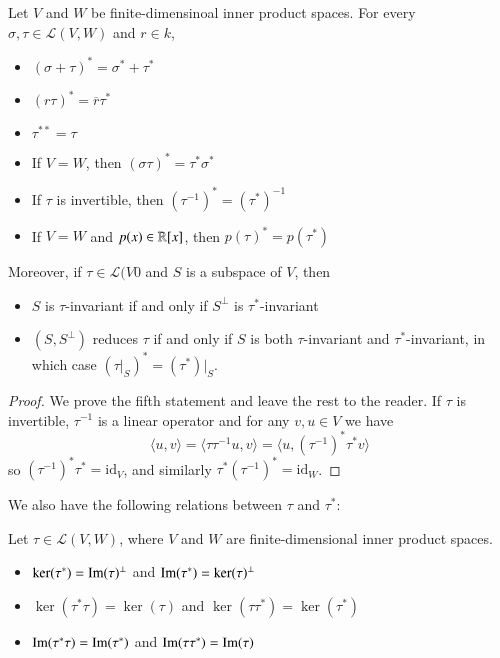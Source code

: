 \begin{theorem}
    Let $V$ and $W$ be finite-dimensinoal inner product spaces. For every $\sigma,\tau \in \mathcal{L}(V,W)$ and $r \in k$, \begin{itemize}
        \item $(\sigma+\tau)^* = \sigma^*+\tau^*$
        \item $(r\tau)^* = \overline{r}\tau^*$
        \item $\tau^{**} = \tau$
        \item If $V = W$, then $(\sigma\tau)^* = \tau^*\sigma^*$
        \item If $\tau$ is invertible, then $(\tau^{-1})^* = (\tau^*)^{-1}$
        \item If $V = W$ and $p(x) \in \mathbb R[x]$, then $p(\tau)^* = p(\tau^*)$
    \end{itemize}
    Moreover, if $\tau \in \mathcal{L}(V0$ and $S$ is a subspace of $V$, then \begin{itemize}
        \item $S$ is $\tau$-invariant if and only if $S^{\perp}$ is $\tau^*$-invariant
        \item $(S,S^{\perp})$ reduces $\tau$ if and only if $S$ is both $\tau$-invariant and $\tau^*$-invariant, in which case $(\tau\vert_S)^* = (\tau^*)\vert_S$.
    \end{itemize}
\end{theorem}
\begin{proof}
    We prove the fifth statement and leave the rest to the reader. If $\tau$ is invertible, $\tau^{-1}$ is a linear operator and for any $v,u \in V$ we have \begin{equation*}
        \langle u,v\rangle = \langle \tau\tau^{-1}u,v\rangle = \langle u,(\tau^{-1})^*\tau^*v \rangle
    \end{equation*}
    so $(\tau^{-1})^*\tau^* = \text{id}_V$, and similarly $\tau^*(\tau^{-1})^* = \text{id}_W$.
\end{proof}

We also have the following relations between $\tau$ and $\tau^*$: 

\begin{theorem}
    Let $\tau \in \mathcal{L}(V,W)$, where $V$ and $W$ are finite-dimensional inner product spaces. \begin{itemize}
        \item $\ker(\tau^*) = \operatorname{Im}(\tau)^{\perp}$ and $\operatorname{Im}(\tau^*) = \ker(\tau)^{\perp}$
        \item $\ker(\tau^*\tau) = \ker(\tau)$ and $\ker(\tau\tau^*) = \ker(\tau^*)$
        \item $\operatorname{Im}(\tau^*\tau) = \operatorname{Im}(\tau^*)$ and $\operatorname{Im}(\tau\tau^*) = \operatorname{Im}(\tau)$
    \end{itemize}
\end{theorem}

